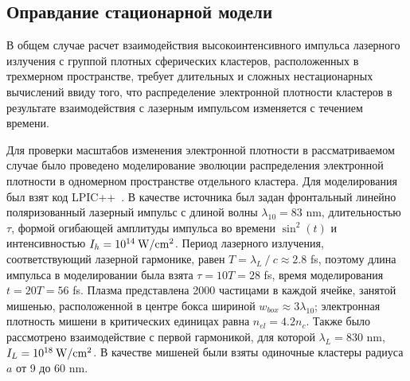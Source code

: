 \subsection{Оправдание стационарной модели}

В общем случае расчет взаимодействия высокоинтенсивного импульса лазерного излучения с группой плотных сферических кластеров, расположенных в трехмерном пространстве, требует длительных и сложных нестационарных вычислений ввиду того, что распределение электронной плотности кластеров в результате взаимодействия с лазерным импульсом изменяется с течением времени.

Для проверки масштабов изменения электронной плотности в рассматриваемом случае было проведено моделирование эволюции распределения электронной плотности в одномерном пространстве отдельного кластера. Для моделирования был взят код LPIC++~\cite{Pfund1998}. В качестве источника был задан фронтальный линейно поляризованный лазерный импульс с длиной волны $\lambda_{10} = 83$ nm, длительностью $\tau$, формой огибающей амплитуды импульса во времени $\sin^2{(t)}$ и интенсивностью $I_{h} = 10^{14}\:\rm{W}/\rm{cm}^2$. Период лазерного излучения, соответствующий лазерной гармонике, равен $T = \lambda_{L}\:/\:c \approx 2.8$ fs, поэтому длина импульса в моделировании была взята $\tau = 10T = 28$ fs, время моделирования $t = 20T = 56$ fs. Плазма представлена 2000 частицами в каждой ячейке, занятой мишенью, расположенной в центре бокса шириной $w_{box} \approx 3\lambda_{10}$; электронная плотность мишени в критических единицах равна $n_{el} = 4.2 n_c$. Также было рассмотрено взаимодействие с первой гармоникой, для которой $\lambda_L = 830$ nm, $I_L = 10^{18}\:\rm{W}/\rm{cm}^2$. В качестве мишеней были взяты одиночные кластеры радиуса $a$ от 9 до 60 nm.





